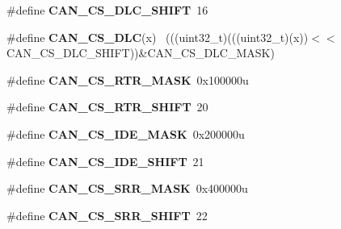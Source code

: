 \begin{DoxyCompactItemize}
\item 
\hypertarget{group___c_a_n___register___masks_ga4e110f941e1580ad04b71b8ee68605ce}{}\#define {\bfseries C\+A\+N\+\_\+\+C\+S\+\_\+\+D\+L\+C\+\_\+\+S\+H\+I\+F\+T}~16\label{group___c_a_n___register___masks_ga4e110f941e1580ad04b71b8ee68605ce}

\item 
\hypertarget{group___c_a_n___register___masks_ga98812d54e5e9e0221b4ad8729b2503d8}{}\#define {\bfseries C\+A\+N\+\_\+\+C\+S\+\_\+\+D\+L\+C}(x)                                                    ~(((uint32\+\_\+t)(((uint32\+\_\+t)(x))$<$$<$C\+A\+N\+\_\+\+C\+S\+\_\+\+D\+L\+C\+\_\+\+S\+H\+I\+F\+T))\&C\+A\+N\+\_\+\+C\+S\+\_\+\+D\+L\+C\+\_\+\+M\+A\+S\+K)\label{group___c_a_n___register___masks_ga98812d54e5e9e0221b4ad8729b2503d8}

\item 
\hypertarget{group___c_a_n___register___masks_ga64cd76de04f63c4e897feab93243a4d1}{}\#define {\bfseries C\+A\+N\+\_\+\+C\+S\+\_\+\+R\+T\+R\+\_\+\+M\+A\+S\+K}~0x100000u\label{group___c_a_n___register___masks_ga64cd76de04f63c4e897feab93243a4d1}

\item 
\hypertarget{group___c_a_n___register___masks_ga3298f7864757605895c4495c51d4f675}{}\#define {\bfseries C\+A\+N\+\_\+\+C\+S\+\_\+\+R\+T\+R\+\_\+\+S\+H\+I\+F\+T}~20\label{group___c_a_n___register___masks_ga3298f7864757605895c4495c51d4f675}

\item 
\hypertarget{group___c_a_n___register___masks_ga8195b85087fd378777c67830ac2ca9fb}{}\#define {\bfseries C\+A\+N\+\_\+\+C\+S\+\_\+\+I\+D\+E\+\_\+\+M\+A\+S\+K}~0x200000u\label{group___c_a_n___register___masks_ga8195b85087fd378777c67830ac2ca9fb}

\item 
\hypertarget{group___c_a_n___register___masks_gae432768b4222f18cc1cec2b71ea8c579}{}\#define {\bfseries C\+A\+N\+\_\+\+C\+S\+\_\+\+I\+D\+E\+\_\+\+S\+H\+I\+F\+T}~21\label{group___c_a_n___register___masks_gae432768b4222f18cc1cec2b71ea8c579}

\item 
\hypertarget{group___c_a_n___register___masks_gafd71067968d03b95e1dae32dc18ac578}{}\#define {\bfseries C\+A\+N\+\_\+\+C\+S\+\_\+\+S\+R\+R\+\_\+\+M\+A\+S\+K}~0x400000u\label{group___c_a_n___register___masks_gafd71067968d03b95e1dae32dc18ac578}

\item 
\hypertarget{group___c_a_n___register___masks_ga77681ba56144cadb15bce536a1fd016d}{}\#define {\bfseries C\+A\+N\+\_\+\+C\+S\+\_\+\+S\+R\+R\+\_\+\+S\+H\+I\+F\+T}~22\label{group___c_a_n___register___masks_ga77681ba56144cadb15bce536a1fd016d}


\end{DoxyCompactItemize}
